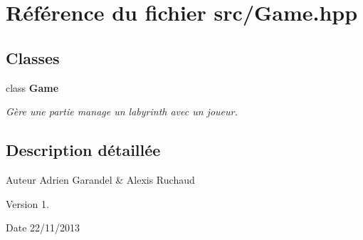 \section{Référence du fichier src/\-Game.hpp}
\label{_game_8hpp}
\subsection*{Classes}
\begin{DoxyCompactItemize}
\item 
class {\bf Game}
\begin{DoxyCompactList}\small\item\em Gère une partie manage un labyrinth avec un joueur. \end{DoxyCompactList}\end{DoxyCompactItemize}


\subsection{Description détaillée}
\begin{DoxyAuthor}{Auteur}
Adrien Garandel \& Alexis Ruchaud 
\end{DoxyAuthor}
\begin{DoxyVersion}{Version}
1. 
\end{DoxyVersion}
\begin{DoxyDate}{Date}
22/11/2013 
\end{DoxyDate}
